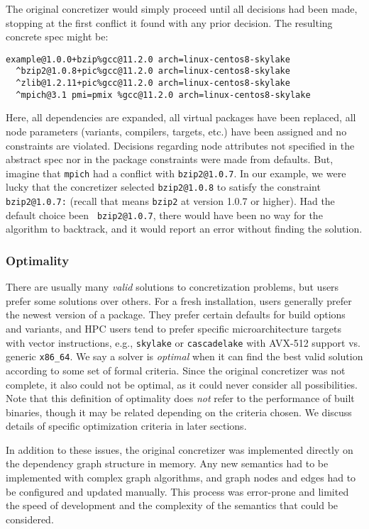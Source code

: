 The original concretizer would simply proceed until all decisions had been made,
stopping at the first conflict it found with any prior decision. The
resulting concrete spec might be:
\begin{verbatim}
example@1.0.0+bzip%gcc@11.2.0 arch=linux-centos8-skylake
  ^bzip2@1.0.8+pic%gcc@11.2.0 arch=linux-centos8-skylake
  ^zlib@1.2.11+pic%gcc@11.2.0 arch=linux-centos8-skylake
  ^mpich@3.1 pmi=pmix %gcc@11.2.0 arch=linux-centos8-skylake
\end{verbatim}
Here, all dependencies are expanded, all virtual packages have been replaced, all node
parameters (variants, compilers, targets, etc.) have been assigned and no constraints
are violated. Decisions regarding node attributes not specified in the abstract spec nor
in the package constraints were made from defaults. But, imagine that {\tt mpich} had a
conflict with {\tt bzip2@1.0.7}. In our example, we were lucky that the concretizer
selected {\tt bzip2@1.0.8} to satisfy the constraint {\tt bzip2@1.0.7:} (recall that
means \texttt{bzip2} at version 1.0.7 or higher). Had the default choice been {\tt
  bzip2@1.0.7}, there would have been no way for the algorithm to backtrack, and it would
report an error without finding the solution.

\subsubsection{Optimality}
There are usually many {\it valid} solutions to concretization problems, but users
prefer some solutions over others. For a fresh installation, users generally prefer the
newest version of a package. They prefer certain defaults for build options and
variants, and HPC users tend to prefer specific microarchitecture targets with vector
instructions, e.g., {\tt skylake} or {\tt cascadelake} with AVX-512 support vs. generic
{\tt x86\_64}. We say a solver is {\it optimal} when it can find the best valid solution
according to some set of formal criteria. Since the original concretizer was not
complete, it also could not be optimal, as it could never consider all possibilities.
Note that this definition of optimality does {\it not} refer to the performance of built
binaries, though it may be related depending on the criteria chosen. We discuss details
of specific optimization criteria in later sections.

In addition to these issues, the original concretizer was implemented directly on the
dependency graph structure in memory. Any new semantics had to be implemented with
complex graph algorithms, and graph nodes and edges had to be configured and updated
manually. This process was error-prone and limited the speed of development and the
complexity of the semantics that could be considered.
